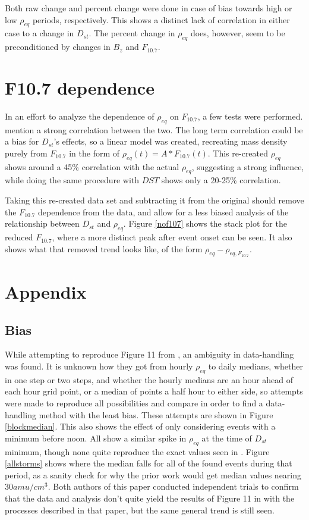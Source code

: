 \documentclass[10pt,twocolumn]{article}
\begin{document}
Both raw change and percent change were done in case of bias towards high or low $\rho_{eq}$ periods, respectively. This shows a distinct lack of correlation in either case to a change in $D_{st}$. The percent change in $\rho_{eq}$ does, however, seem to be preconditioned by changes in $B_z$ and $F_{10.7}$.



\section{F10.7 dependence}
In an effort to analyze the dependence of $\rho_{eq}$ on $F_{10.7}$, a few tests were performed. \cite{Takahashi2010} mention a strong correlation between the two. The long term correlation could be a bias for $D_{st}$'s effects, so a linear model was created, recreating mass density purely from $F_{10.7}$ in the form of $\rho_{eq}(t)=A*F_{10.7}(t)$. This re-created $\rho_{eq}$ shows around a 45\% correlation with the actual $\rho_{eq}$, suggesting a strong influence, while doing the same procedure with $DST$ shows only a 20-25\% correlation. 

Taking this re-created data set and subtracting it from the original should remove the $F_{10.7}$ dependence from the data, and allow for a less biased analysis of the relationship between $D_{st}$ and $\rho_{eq}$. Figure \ref{nof107} shows the stack plot for the reduced $F_{10.7}$, where a more distinct peak after event onset can be seen. It also shows what that removed trend looks like, of the form $\rho_{eq}-\rho_{eq,F_{10.7}}$.

\section{Appendix}
\subsection{Bias}
While attempting to reproduce Figure 11 from \cite{Takahashi2010}, an ambiguity in data-handling was found. It is unknown how they got from hourly $\rho_{eq}$ to daily medians, whether in one step or two steps, and whether the hourly medians are an hour ahead of each hour grid point, or a median of points a half hour to either side, so attempts were made to reproduce all possibilities and compare in order to find a data-handling method with the least bias. These attempts are shown in Figure \ref{blockmedian}. This also shows the effect of only considering events with a minimum before noon. All show a similar spike in $\rho_{eq}$ at the time of $D_{st}$ minimum, though none quite reproduce the exact values seen in \cite{Takahashi2010}. Figure \ref{allstorms} shows where the median falls for all of the found events during that period, as a sanity check for why the prior work would get median values nearing $30 amu/cm^3$. Both authors of this paper conducted independent trials to confirm that the data and analysis don't quite yield the results of Figure 11 in \cite{Takahashi2010} with the processes described in that paper, but the same general trend is still seen. 
\end{document}
